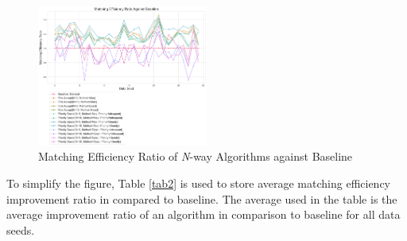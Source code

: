 \documentclass[conference]{IEEEtran}
\begin{document}
\begin{figure}[h]
    \includegraphics[width=0.5\textwidth]{images/matching_efficiency_ratio_against_baseline.png}
    \caption{Matching Efficiency Ratio of \textit{N}-way Algorithms against Baseline}
    \label{matcheffratio}
\end{figure}

To simplify the figure, Table \ref{tab2} is used to store average matching efficiency improvement ratio in compared to baseline. The average used
in the table is the average improvement ratio of an algorithm in comparison to baseline for all data seeds.
\end{document}
